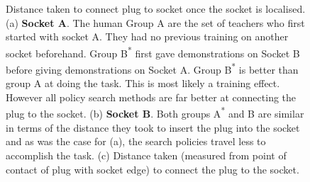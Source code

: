 \begin{figure}
 \centering
  \caption{Distance taken to connect plug to socket once the socket is localised. (a) \textbf{Socket A}. The human 
  Group A are the set of teachers who first started with socket A. They had no previous training on another socket beforehand. Group 
  B\textsuperscript{*} first gave demonstrations on Socket B before giving demonstrations on Socket A. Group B\textsuperscript{*}
  is better than group A at doing the task. This is most likely a training effect. However all policy search methods are far better
  at connecting the plug to the socket. (b) \textbf{Socket B}. Both groups A\textsuperscript{*} and B are similar in terms 
  of the distance they took to insert the plug into the socket and as was the case for (a), the search policies travel less to accomplish 
  the task. (c) Distance taken (measured from point of contact of plug with socket edge) to connect the plug to the socket.  } 
  \label{fig:real_statistics}
\end{figure}

